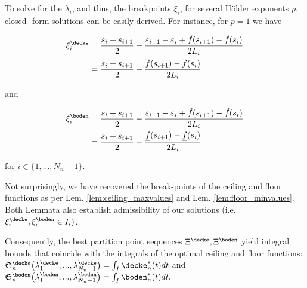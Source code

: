 To solve for the $\lambda_i$, and thus, the breakpoints $\xi_i$, for several H\"older exponents $p$, closed -form solutions can be easily derived. For instance, for $p=1$ we have

\begin{align}
 \xi_i^\decke &= \frac{ s_i    + s_{i+1}}{2} + \frac{\varepsilon_{i+1} - \varepsilon_i   +\tilde f(s_{i+1}) - \tilde f(s_i) }{ 2 L_i} \\
&= \frac{ s_i    + s_{i+1}}{2} + \frac{ \overline f(s_{i+1}) - 
\overline f(s_i) }{ 2 L_i} \label{eq:lipxiceil}
\end{align}

and 

\begin{align}
   \xi_{i}^\boden    &=   \frac{ s_i    + s_{i+1}}{2} - \frac{\varepsilon_{i+1} - \varepsilon_i   +\tilde f(s_{i+1}) - \tilde f(s_i) }{ 2 L_i} \\
&= \frac{ s_i    + s_{i+1}}{2} - \frac{ \underline f(s_{i+1}) - 
\underline f(s_i) }{ 2 L_i} \label{eq:lipxifloor}
\end{align}

%
%

for $ i \in \{1,\ldots,{N_n}-1\} $.



Not surprisingly, we have recovered the break-points of the ceiling and floor functions as per  Lem. \ref{lem:ceiling_maxvalues} and Lem. \ref{lem:floor_minvalues}. Both Lemmata also establish admissibility of our solutions (i.e. $\xi^\decke_i, \xi^\boden_i \in I_i)$. 

Consequently, the best partition point sequences  $\Xi^\decke,\Xi^\boden  $ yield integral bounds that coincide with the integrals of the optimal ceiling and floor functions:
$\mathfrak S^\decke_n\bigl(\lambda_1^\decke ,...,\lambda_{{N_n}-1}^\decke \bigr) = \int_I \decke^*_n(t) dt$ and
$\mathfrak S^\boden_n\bigl(\lambda_1^\boden ,...,\lambda_{{N_n}-1}^\boden \bigr) = \int_I \boden^*_n(t) dt.$

